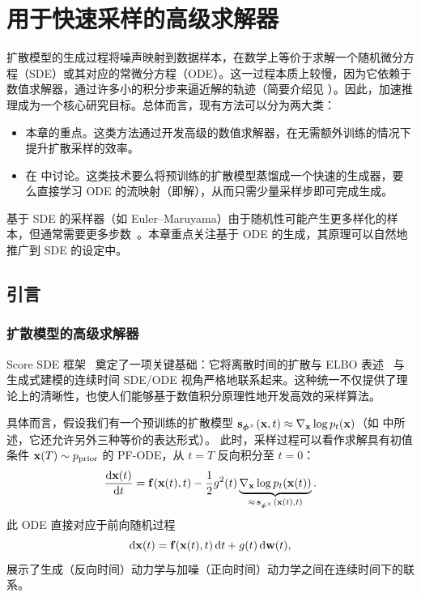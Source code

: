 \chapter{用于快速采样的高级求解器}\label{ch:solvers}


扩散模型的生成过程将噪声映射到数据样本，在数学上等价于求解一个随机微分方程（SDE）或其对应的常微分方程（ODE）。这一过程本质上较慢，因为它依赖于数值求解器，通过许多小的积分步来逼近解的轨迹（简要介绍见 ）。因此，加速推理成为一个核心研究目标。总体而言，现有方法可以分为两大类：
\begin{itemize}
    \item {} 本章的重点。这类方法通过开发高级的数值求解器，在无需额外训练的情况下提升扩散采样的效率。
    \item {} 在  中讨论。这类技术要么将预训练的扩散模型蒸馏成一个快速的生成器，要么直接学习 ODE 的流映射（即解），从而只需少量采样步即可完成生成。
\end{itemize}
基于 SDE 的采样器（如 Euler--Maruyama）由于随机性可能产生更多样化的样本，但通常需要更多步数~\citep{xu2023restart}。本章重点关注基于 ODE 的生成，其原理可以自然地推广到 SDE 的设定中。




\clearpage




\section{引言}
\subsection{扩散模型的高级求解器}

Score SDE 框架~\citep{song2020score} 奠定了一项关键基础：它将离散时间的扩散与 ELBO 表述~\citep{sohl2015deep,ho2020denoising} 与生成式建模的连续时间 SDE/ODE 视角严格地联系起来。这种统一不仅提供了理论上的清晰性，也使人们能够基于数值积分原理性地开发高效的采样算法。

具体而言，假设我们有一个预训练的扩散模型 ${\mathbf{s}}_{\bm{\phi}^\times}({\mathbf{x}}, t) \approx \nabla_{{\mathbf{x}}}\log p_t({\mathbf{x}})$（如  中所述，它还允许另外三种等价的表达形式）。
此时，采样过程可以看作求解具有初值条件 ${\mathbf{x}}(T) \sim p_{\text{prior}}$ 的 PF-ODE，从 $t = T$ 反向积分至 $t = 0$：
\begin{align*}
    \frac{\mathop{}\!\mathrm{d} {\mathbf{x}}(t)}{\mathop{}\!\mathrm{d} t} 
     =  {\mathbf{f}}({\mathbf{x}}(t),t) 
    - \frac{1}{2} g^2(t) \underbrace{\nabla_{{\mathbf{x}}}\log p_t({\mathbf{x}}(t))}_{\approx\,  {\mathbf{s}}_{\bm{\phi}^\times}({\mathbf{x}}(t), t)}.
\end{align*}
此 ODE 直接对应于前向随机过程
\[
\mathop{}\!\mathrm{d}{\mathbf{x}}(t) = {\mathbf{f}}({\mathbf{x}}(t),t)\mathop{}\!\mathrm{d} t + g(t)\mathop{}\!\mathrm{d}{\mathbf{w}}(t),
\]
展示了生成（反向时间）动力学与加噪（正向时间）动力学之间在连续时间下的联系。


